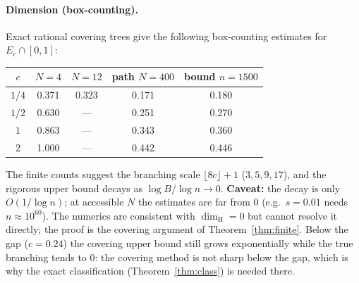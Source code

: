 \documentclass[11pt]{article}
\theoremstyle{definition}
\theoremstyle{remark}
\newcommand{\dimH}{\dim_{\mathrm{H}}}
\begin{document}
\paragraph{Dimension (box-counting).} Exact rational covering trees give the
following box-counting estimates for $E_c\cap[0,1]$:
\begin{center}
\begin{tabular}{c|cccc}
$c$ & $N=4$ & $N=12$ & path $N=400$ & bound $n=1500$\\\hline
$1/4$ & 0.371 & 0.323 & 0.171 & 0.180\\
$1/2$ & 0.630 & --- & 0.251 & 0.270\\
$1$   & 0.863 & --- & 0.343 & 0.360\\
$2$   & 1.000 & --- & 0.442 & 0.446
\end{tabular}
\end{center}
The finite counts suggest the branching scale $\lfloor8c\rfloor+1$ ($3,5,9,17$), and
the rigorous upper bound decays as $\log B/\log n\to0$. \textbf{Caveat:} the
decay is only $O(1/\log n)$; at accessible $N$ the estimates are far from $0$
(e.g.\ $s=0.01$ needs $n\approx10^{60}$). The numerics are consistent with
$\dimH=0$ but cannot resolve it directly; the proof is the covering argument of
Theorem~\ref{thm:finite}. Below the gap ($c=0.24$) the covering upper bound
still grows exponentially while the true branching tends to $0$: the covering
method is not sharp below the gap, which is why the exact classification
(Theorem~\ref{thm:class}) is needed there.
\end{document}
